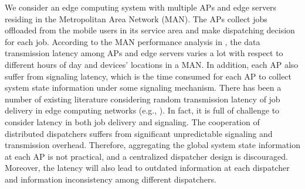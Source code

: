 We consider an edge computing system with multiple APs and edge servers residing in the Metropolitan Area Network (MAN).
The APs collect jobs offloaded from the mobile users in its service area and make dispatching decision for each job. According to the MAN performance analysis in \cite{MAN-LATENCY}, the data transmission latency {among APs and edge servers} varies a lot with respect to different hours of day and devices' locations in a MAN. {In addition, each AP also suffer from signaling latency, which is the time consumed for each AP to collect system state information under some signaling mechanism.}
There has been a number of existing literature considering random transmission latency of job delivery in edge computing networks (e.g., \cite{latency-EDGE19,MOBIHOC19-ZhouZ,IOTJ18-FanQ,TOC19-LiuC,JSAC19-AlameddineHA}). 
In fact, it is full of challenge to consider latency in {both job delivery and} signaling. The cooperation of distributed dispatchers suffers from significant unpredictable signaling and transmission overhead. Therefore, aggregating the global system state information at each AP is not practical, and a centralized dispatcher design is discouraged. Moreover, the latency will also lead to outdated information at each dispatcher and information inconsistency among different dispatchers.



